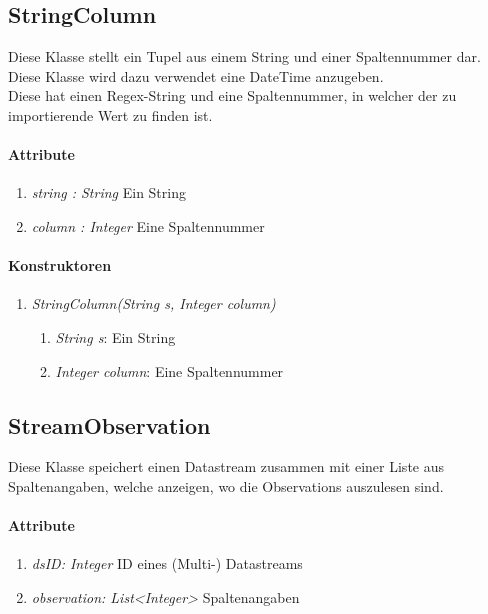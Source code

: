 \subsection*{StringColumn}\label{strCol}
Diese Klasse stellt ein Tupel aus einem String und einer Spaltennummer dar.
Diese Klasse wird dazu verwendet eine DateTime anzugeben. \\Diese hat einen Regex-String und eine Spaltennummer, in welcher der zu importierende Wert zu finden ist.
\paragraph{Attribute}
\begin{enumerate}[-]
	\item \textit{string : String} Ein String
	\item \textit{column : Integer} Eine Spaltennummer
\end{enumerate} 

\paragraph{Konstruktoren}
\begin{enumerate}[+]
	\item \textit{StringColumn(String s, Integer column)} \\
	
	\begin{enumerate}[$\bullet$]
		\item \textit{String s}: Ein String
		\item \textit{Integer column}: Eine Spaltennummer
	\end{enumerate}
\end{enumerate}







\subsection*{StreamObservation}\label{strObs}
Diese Klasse speichert einen Datastream zusammen mit einer Liste aus Spaltenangaben, welche anzeigen, wo die Observations auszulesen sind.
\paragraph{Attribute} 
\begin{enumerate}[-]
	\item \textit{dsID: Integer} ID eines (Multi-) Datastreams
	\item \textit{observation: List<Integer>} Spaltenangaben
\end{enumerate}

